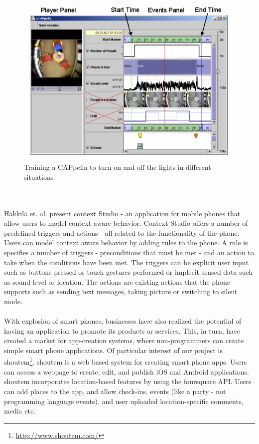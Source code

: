 \begin{figure}
	\centering
	\includegraphics[scale=0.4]{fig/acappella}
	\caption{Training a CAPpella \cite{Li:2004:TTP:1029632.1029671} to turn on and off the lights in different situations}
	\label{fig:topiary}
\end{figure}
\\\\
Häkkilä et. al. present context Studio - an application for mobile phones that allow users to model context aware behavior. Context Studio offers a number of predefined triggers and actions - all related to the functionality of the phone. Users can model context aware behavior by adding rules to the phone. A rule is specifies a number of triggers - preconditions that must be met - and an action to take when the conditions have been met. The triggers can be explicit user input such as buttons pressed or touch gestures performed or implecit sensed data such as sound-level or location. The actions are existing actions that the phone supports such as sending text messages, taking picture or switching to silent mode.
\\\\ 
With explosion of smart phones, businesses have also realized the potential of having an application to promote its products or services. This, in turn, have created a market for app-creation systems, where non-programmers can create simple smart phone applications. Of particular interest of our project is shoutem\footnote{\url{http://www.shoutem.com/}}. shoutem is a web based system for creating smart phone apps. Users can access a webpage to create, edit, and publish iOS and Android applications. shoutem incorporates location-based features by using the foursquare API. Users can add places to the app, and allow check-ins, events (like a party - not programming language events), and user uploaded location-specific comments, media etc. 
